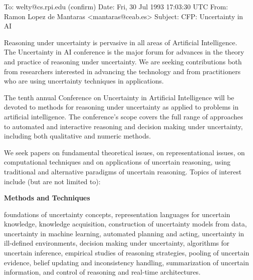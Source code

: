  
To: welty@cs.rpi.edu (confirm)
Date: Fri, 30 Jul 1993 17:03:30 UTC
From: Ramon Lopez de Mantaras <mantaras@ceab.es>
Subject: CFP: Uncertainty in AI 


\setlength{\parskip}{0.10in}
\setlength{\parindent}{0in}
\setlength{\textheight}{10.0in}
\setlength{\textwidth}{6.5in}
\setlength{\topmargin}{-1in}
\setlength{\oddsidemargin}{0.0in}
\setlength{\columnsep}{0.3in}
\newcommand{\comment}[1]{}

\def\thepage{}




Reasoning under uncertainty is pervasive in all areas of Artificial
Intelligence. The Uncertainty in AI conference is the major forum for
advances in the theory and practice of reasoning under uncertainty.
We are seeking contributions both from researchers interested in
advancing the technology and from practitioners who are using
uncertainty techniques in applications.

The tenth annual Conference on Uncertainty in Artificial Intelligence
will be devoted to methods for reasoning under uncertainty as applied
to problems in artificial intelligence.  The conference's scope covers
the full range of approaches to automated and interactive reasoning
and decision making under uncertainty, including both qualitative and
numeric methods.

We seek papers on fundamental theoretical issues, on representational
issues, on computational techniques and on applications of uncertain
reasoning, using traditional and alternative paradigms of uncertain
reasoning.  Topics of interest include (but are not limited to):


{\bf Methods and Techniques}

foundations of uncertainty concepts,
representation languages for uncertain knowledge,
knowledge acquisition,
construction of uncertainty models from data,
uncertainty in machine learning,
automated planning and acting,
uncertainty in ill-defined environments,
decision making under uncertainty,
algorithms for uncertain inference,
empirical studies of reasoning strategies,
pooling of uncertain evidence,
belief updating and inconsistency handling,
summarization of uncertain information, and
control of reasoning and real-time architectures.

